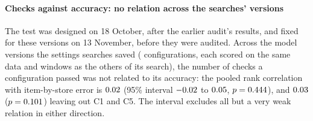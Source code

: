 \paragraph{Checks against accuracy: no relation across the searches' versions}
The test was designed on 18 October, after the earlier audit's results, and
fixed for these versions on 13 November, before they were audited. Across the
\tSearchVersions{} model versions the settings searches saved
(\tConfigsAll{} configurations, each scored on the same data and windows as the
others of its search), the number of checks a configuration passed was not
related to its accuracy: the pooled rank correlation with item-by-store error
is $0.02$ (95\% interval $-0.02$ to $0.05$, $p=0.444$), and
$0.03$ ($p=0.101$) leaving out C1 and C5. The interval
excludes all but a very weak relation in either direction.
